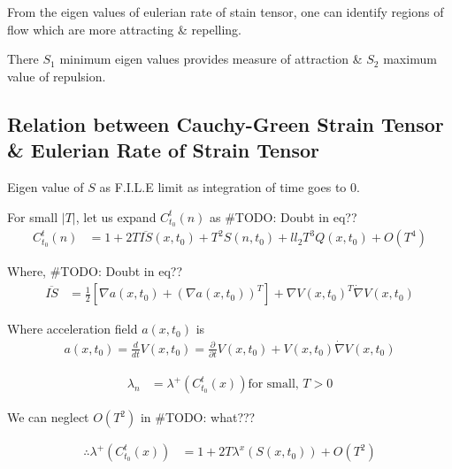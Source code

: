 \documentclass[../report.tex]{subfiles}
\begin{document}
From the eigen values of eulerian rate of stain tensor, one can identify regions of flow which are more attracting \& repelling. \par

There \(S_1\) \rightarrow minimum eigen values provides measure of attraction \& \(S_2\) maximum value of repulsion.

\subsection{Relation between Cauchy-Green Strain Tensor \& Eulerian Rate of Strain Tensor}
Eigen value of \(S\) as F.I.L.E limit as integration of time goes to 0. \par

For small \(|T|\), let us expand  \(C_{t_0}^t (n)\) as
\#TODO: Doubt in eq??
\begin{equation}
  \begin{aligned}
    C_{t_0}^t (n) &= 1 + 2T \overline{IS}(x, t_0) + T^2 S(n, t_0) + ll_2 T^3 Q(x, t_0) + O(T^4)
  \end{aligned}
\end{equation}

Where, 
\#TODO: Doubt in eq??
\begin{equation}
  \begin{aligned}
    \overline{IS} &= \frac{1}{2}[\nabla a(x, t_0) + (\nabla a(x, t_0))^T] + \nabla V(x, t_0)^T \dot \nabla V(x, t_0)
  \end{aligned}
\end{equation}

Where acceleration field \(a(x, t_0)\) is
\begin{equation}
  \begin{aligned}
    a(x, t_0) = \frac{d}{dt}V(x, t_0) = \frac{\partial}{\partial t} V(x, t_0) + V(x, t_0) \dot \nabla V(x, t_0)
  \end{aligned}
\end{equation}

\begin{equation}
  \begin{aligned}
    \lambda_n &= \lambda^+ (C_{t_0}^t (x)) \text{for small, } T > 0
  \end{aligned}
\end{equation}

We can neglect \(O(T^2)\) in \#TODO: what???

\begin{equation}
  \begin{aligned}
    \therefore \lambda^+ (C_{t_0}^t (x)) &= 1 + 2T \lambda^x (S(x, t_0)) + O(T^2)
  \end{aligned}
\end{equation}
\end{document}
